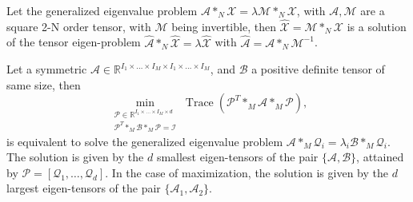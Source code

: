 \documentclass{siamltex}
\begin{document}
\begin{lemma}\cite{zahir2024higher}
Let the generalized eigenvalue problem $\mathcal{A} *_{N} \mathcal{X}=\lambda \mathcal{M} *_{N} \mathcal{X}$, with $\mathcal{A}, \mathcal{M}$ are a square 2-N order tensor, with $\mathcal{M}$ being invertible, then
$\widehat{\mathcal{X}}= \mathcal{M} *_{N} \mathcal{X}$ is a solution of the tensor eigen-problem
$\widehat{\mathcal{A}} *_{N} \widehat{\mathcal{X}}=\lambda \widehat{\mathcal{X}}$ with $\widehat{\mathcal{A}}=\mathcal{A} *_N \mathcal{M}^{-1}$.
\end{lemma}
\medskip
\begin{theorem}\label{thm:tr_pos_def}\cite{zahir2024higher}
Let a symmetric $\mathcal{A} \in \mathbb{R}^{I_1 \times \ldots \times I_M \times I_1 \times \ldots \times I_M}$, and $\mathcal{B}$ a positive definite tensor of same size, then
\[\min_{\substack{\mathcal{P} \in \mathbb{R}^{I_1 \times \ldots \times I_M \times d}\\ \mathcal{P}^T *_M \mathcal{B} *_M \mathcal{P}=\mathcal{I}}} \operatorname{Trace}\left(\mathcal{P}^T *_M \mathcal{A} *_M \mathcal{P}\right), \] is equivalent to solve the generalized eigenvalue problem $\mathcal{A} *_M \mathcal{Q}_i=\lambda_i \mathcal{B} *_M \mathcal{Q}_i$.
The solution is given by the $d$ smallest eigen-tensors of the pair $\{\mathcal{A}, \mathcal{B}\}$, attained by $\mathcal{P}= [\mathcal{Q}_1, \ldots, \mathcal{Q}_d]$.
In the case of maximization, the solution is given by the $d$ largest eigen-tensors of the pair $\{\mathcal{A}_1, \mathcal{A}_2\}$.

\end{theorem}
\end{document}
